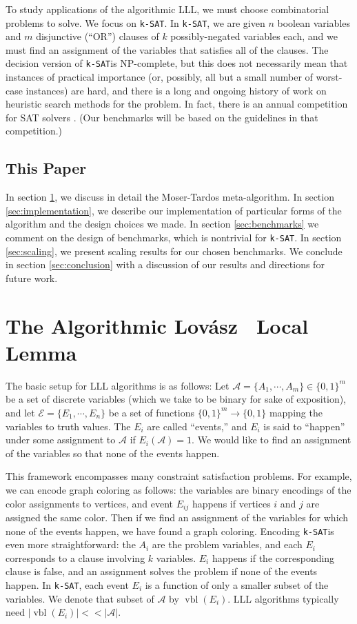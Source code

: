 \documentclass{article}
\newcommand{\ksat}{\texttt{k-SAT}}
\newcommand{\lovasz}{Lov\'{a}sz}
\begin{document}
To study applications of the algorithmic LLL, we must choose combinatorial problems to solve.  We focus on \ksat.  In \ksat, we are given $n$ boolean variables and $m$ disjunctive (``OR'') clauses of $k$ possibly-negated variables each, and we must find an assignment of the variables that satisfies all of the clauses.  The decision version of \ksat is NP-complete, but this does not necessarily mean that instances of practical importance (or, possibly, all but a small number of worst-case instances) are hard, and there is a long and ongoing history of work on heuristic search methods for the problem.  In fact, there is an annual competition for SAT solvers \cite{belov2014sat}.  (Our benchmarks will be based on the guidelines in that competition.)

\subsection{This Paper}
In section \ref{sec:alll}, we discuss in detail the Moser-Tardos meta-algorithm.  In section \ref{sec:implementation}, we describe our implementation of particular forms of the algorithm and the design choices we made.  In section \ref{sec:benchmarks} we comment on the design of benchmarks, which is nontrivial for \ksat.  In section \ref{sec:scaling}, we present scaling results for our chosen benchmarks.  We conclude in section \ref{sec:conclusion} with a discussion of our results and directions for future work.

\section{The Algorithmic \lovasz~ Local Lemma}
\label{sec:alll}

The basic setup for LLL algorithms is as follows: Let $\mathcal{A} = \{A_1, \cdots, A_m\} \in \{0,1\}^m$ be a set of discrete variables (which we take to be binary for sake of exposition), and let $\mathcal{E} = \{E_1, \cdots, E_n\}$ be a set of functions $\{0,1\}^m \to \{0,1\}$ mapping the variables to truth values.  The $E_i$ are called ``events,'' and $E_i$ is said to ``happen'' under some assignment to $\mathcal{A}$ if $E_i(\mathcal{A}) = 1$.  We would like to find an assignment of the variables so that none of the events happen.

This framework encompasses many constraint satisfaction problems.  For example, we can encode graph coloring as follows: the variables are binary encodings of the color assignments to vertices, and event $E_{ij}$ happens if vertices $i$ and $j$ are assigned the same color.  Then if we find an assignment of the variables for which none of the events happen, we have found a graph coloring.  Encoding \ksat is even more straightforward: the $A_i$ are the problem variables, and each $E_i$ corresponds to a clause involving $k$ variables.  $E_i$ happens if the corresponding clause is false, and an assignment solves the problem if none of the events happen.  In \ksat, each event $E_i$ is a function of only a smaller subset of the variables.  We denote that subset of $\mathcal{A}$ by $\operatorname{vbl}(E_i)$.  LLL algorithms typically need $|\operatorname{vbl}(E_i)| << |\mathcal{A}|$.
\end{document}
